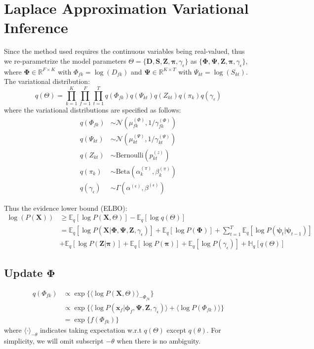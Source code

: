 \documentclass[11pt]{article} %
\begin{document}
\section{Laplace Approximation Variational Inference}
Since the method used requires the continuous variables being real-valued, thus we re-parametrize the model parameters $\Theta = \{\mathbf{D}, \mathbf{S}, \mathbf{Z}, \bm{\pi}, \gamma_\epsilon\}$ as $\{\mathbf{\Phi}, \mathbf{\Psi}, \mathbf{Z}, \bm{\pi}, \gamma_\epsilon\}$, where $\mathbf{\Phi} \in \mathbb{R}^{F\times K}$ with $\Phi_{fk} = \log(D_{fk})$ and $\mathbf{\Psi} \in \mathbb{R}^{K \times T}$ with $\Psi_{kt} = \log(S_{kt})$.
The variational distribution: 
\[
q(\Theta) = \prod_{k=1}^K \prod_{f=1}^F  \prod_{t=1}^T q(\Phi_{fk}) q(\Psi_{kt}) q(Z_{kt}) q(\pi_k) q(\gamma_\epsilon)
\]
where the variational distributions are specified as follows:
\begin{align*}
q(\Phi_{fk}) &\sim \mathcal{N}(\mu_{fk}^{(\Phi)}, 1/\gamma_{fk}^{(\Phi)})\\
q(\Psi_{kt}) &\sim \mathcal{N}(\mu_{kt}^{(\Psi)}, 1/\gamma_{kt}^{(\Psi)})\\
q(Z_{kt}) &\sim \textrm{Bernoulli}(p_{kt}^{(z)})\\
q(\pi_{k}) &\sim \textrm{Beta}(\alpha_k^{(\pi)}, \beta_k^{(\pi)})\\
q(\gamma_\epsilon) &\sim \Gamma(\alpha^{(\epsilon)}, \beta^{(\epsilon)})
\end{align*}

Thus the evidence lower bound (ELBO):
\begin{align*}
\log(P(\mathbf{X})) &\geq \mathbb{E}_q [\log P(\mathbf{X}, \Theta)] - \mathbb{E}_q [\log q(\Theta)]\\
&= \mathbb{E}_q [\log P(\mathbf{X} | \mathbf{\Phi}, \mathbf{\Psi}, \mathbf{Z}, \gamma_\epsilon)] + \mathbb{E}_q [\log P(\mathbf{\Phi})] + \sum_{t=1}^T \mathbb{E}_q [\log P(\bm{\psi}_t | \bm{\psi}_{t-1})]\\
 &+ \mathbb{E}_q[\log P(\mathbf{Z} | \bm{\pi})] + \mathbb{E}_q[\log P(\bm{\pi})] + \mathbb{E}_q[\log P(\gamma_\epsilon)] + \mathbb{H}_q [q(\Theta)] 
\end{align*}


\subsection{Update $\mathbf{\Phi}$}\label{sec:phi}
\begin{align*}
q(\Phi_{fk}) &\propto \exp\{\langle\log P(\mathbf{X}, \Theta)\rangle_{-\Phi_{fk}}\}\\
&\propto \exp\{\langle \log P(\bm{x}_f | \bm{\phi}_f, \bm{\Psi}, \mathbf{Z}, \gamma_\epsilon)\rangle + \langle \log P(\Phi_{fk}) \rangle\}\\
&= \exp\{f(\Phi_{fk})\}
\end{align*}
where $\langle \cdot \rangle_{-\theta}$ indicates taking expectation w.r.t $q(\Theta)$ except $q(\theta)$. For simplicity, we will omit subscript $-\theta$ when there is no ambiguity.
\end{document}
